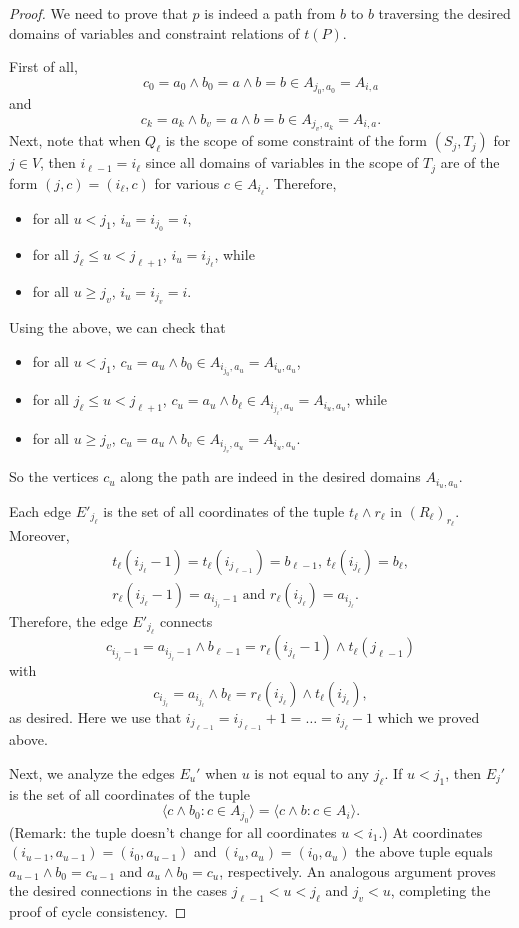 \documentclass[11pt]{amsart}
\newcommand{\lb}{\langle}
\newcommand{\rb}{\rangle}
\newcommand{\mt}{\wedge}
\theoremstyle{definition}
\begin{document}
\begin{proof}
We need to prove that $p$ is indeed a path from $b$ to $b$ traversing the desired domains of variables and constraint relations of $t(P)$.

First of all, \[c_0=a_0\mt b_0=a\mt b=b\in A_{j_0,a_0}=A_{i,a}\] 
and 
\[c_k=a_k\mt b_v=a\mt b=b\in A_{j_v,a_k}=A_{i,a}.\]
Next, note that when $Q_\ell$ is the scope of some constraint of the form $(S_j,T_j)$ for $j\in V$, then $i_{\ell-1}=i_\ell$ since all domains of variables in the scope of $T_j$ are of the form $(j,c)=(i_\ell,c)$ for various $c\in A_{i_\ell}$. Therefore, 
\begin{itemize}
\item for all $u<j_1$, $i_u=i_{j_0}=i$,
\item for all $j_{\ell}\leq u<j_{\ell+1}$, $i_u=i_{j_{\ell}}$, while
\item for all $u\geq j_v$, $i_u=i_{j_v}=i$.
\end{itemize}
Using the above, we can check that
\begin{itemize}
\item for all $u<j_1$, $c_u=a_u\mt b_0\in A_{i_{j_0},a_u}=A_{i_u,a_u}$,
\item for all $j_\ell\leq u<j_{\ell+1}$, $c_u=a_u\mt b_\ell\in A_{i_{j_\ell},a_u}=A_{i_u,a_u}$, while
\item for all $u\geq j_v$, $c_u=a_u\mt b_v\in A_{i_{j_v},a_u}=A_{i_u,a_u}$.
\end{itemize}
So the vertices $c_u$ along the path are indeed in the desired domains $A_{i_u,a_u}$.

Each edge $E'_{j_\ell}$ is the set of all coordinates of the tuple $t_\ell\mt r_\ell$ in $(R_\ell)_{r_\ell}$. Moreover, 
\[
\begin{gathered}
t_\ell(i_{j_\ell}-1)=t_\ell(i_{j_{\ell-1}})=b_{\ell-1}\text{, }t_\ell(i_{j_\ell})=b_\ell,\\
r_\ell(i_{j_\ell}-1)=a_{i_{j_\ell}-1}\text{ and }r_\ell(i_{j_\ell})=a_{i_{j_\ell}}.
\end{gathered}
\]
Therefore, the edge $E'_{j_\ell}$ connects 
\[c_{i_{j_\ell}-1}=a_{i_{j_\ell}-1}\mt b_{\ell-1}=r_{\ell}(i_{j_\ell}-1)\mt t_\ell(j_{\ell-1})\]
with 
\[c_{i_{j_\ell}}=a_{i_{j_\ell}}\mt b_{\ell}=r_{\ell}(i_{j_{\ell}})\mt t_\ell(i_{j_{\ell}}),\]
as desired. Here we use that $i_{j_{\ell-1}}=i_{j_{\ell-1}}+1=\dots=i_{j_{\ell}}-1$ which we proved above.

Next, we analyze the edges $E_u'$ when $u$ is not equal to any $j_\ell$. If $u<j_1$, then $E_j'$ is the set of all coordinates of the tuple
\[\lb c\mt b_0:c\in A_{j_0}\rb=\lb c\mt b:c\in A_i\rb.\]
(Remark: the tuple doesn't change for all coordinates $u<i_1$.) At coordinates $(i_{u-1},a_{u-1})=(i_0,a_{u-1})$ and $(i_u,a_u)=(i_0,a_u)$ the above tuple equals $a_{u-1}\mt b_0=c_{u-1}$ and $a_u\mt b_0=c_u$, respectively. An analogous argument proves the desired connections in the cases $j_{\ell-1}<u<j_\ell$ and $j_v<u$, completing the proof of cycle consistency.


\end{proof}
\end{document}
